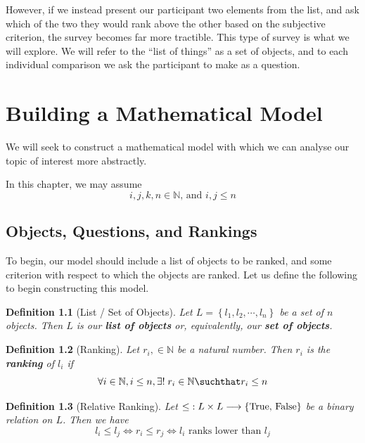 \documentclass[12pt]{book}
\theoremstyle{definitionstyle}
\newtheorem{definition}{Definition}[section]
\numberwithin{equation}{section}
\begin{document}
\vspace{0.5em}

However, if we instead present our participant two elements from the list, and ask which of the two they would rank above the other based on the subjective criterion, the survey becomes far more tractible. This type of survey is what we will explore. We will refer to the ``list of things'' as a set of objects, and to each individual comparison we ask the participant to make as a question.

\chapter{Building a Mathematical Model}

We will seek to construct a mathematical model with which we can analyse our topic of interest more abstractly.

In this chapter, we may assume 
$$ i,j,k,n\in\mathbb{N}\text{, and } i,j\leq n$$

\newpage
\section{Objects, Questions, and Rankings}

To begin, our model should include a list of objects to be ranked, and some criterion with respect to which the objects are ranked.
Let us define the following to begin constructing this model.

\vspace{0.5em}

\begin{definition}[List / Set of Objects]
    Let $L = \left\{l_1, l_2, \cdots, l_n \right\}$ be a set of $n$ objects. Then $L$ is our \textbf{list of objects} or, equivalently, our \textbf{set of objects}.
\end{definition}

\vspace{0.5em}

\begin{definition}[Ranking] Let $r_i,\in \mathbb{N}$ be a natural number. Then $r_i$ is the \textbf{ranking} of $l_i$ if 
    $$\forall i\in\mathbb{N}, i \leq n, \exists!\;r_i\in\mathbb{N} \suchthat r_i \leq n$$
\end{definition}

\vspace{0.5em}

\begin{definition}[Relative Ranking]
    Let $\func{\leq\;}{L\times L}{\{\text{True, False}\}}$ be a binary relation on $L$. Then we have
	$$ l_i\leq l_j \iff r_i \leq r_j \iff l_i\text{ ranks lower than }l_j$$
\end{definition}
\end{document}
